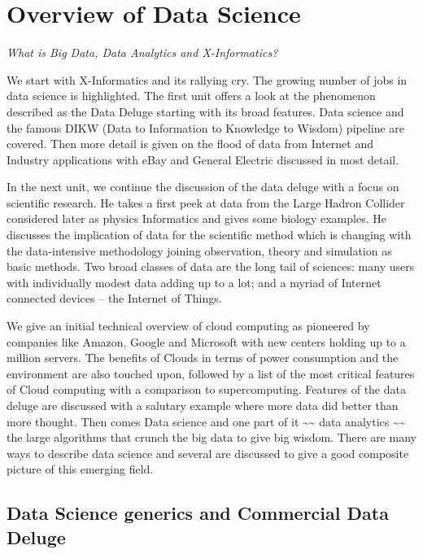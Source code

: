 

\section{Overview of Data Science}\label{overview-of-data-science}

\FILENAME

\emph{What is Big Data, Data Analytics and X-Informatics?}

We start with X-Informatics and its rallying cry.
The growing number of jobs in data science is highlighted. The first
unit offers a look at the phenomenon described as the Data Deluge
starting with its broad features. Data science and the famous DIKW (Data
to Information to Knowledge to Wisdom) pipeline are covered. Then more
detail is given on the flood of data from Internet and Industry
applications with eBay and General Electric discussed in most detail.

In the next unit, we continue the discussion of the data deluge with a
focus on scientific research. He takes a first peek at data from the
Large Hadron Collider considered later as physics Informatics and gives
some biology examples. He discusses the implication of data for the
scientific method which is changing with the data-intensive methodology
joining observation, theory and simulation as basic methods. Two broad
classes of data are the long tail of sciences: many users with
individually modest data adding up to a lot; and a myriad of Internet
connected devices -- the Internet of
Things.

We give an initial technical overview of cloud computing as pioneered by
companies like Amazon, Google and Microsoft with new centers holding up
to a million servers. The benefits of Clouds in terms of power
consumption and the environment are also touched upon, followed by a
list of the most critical features of Cloud computing with a comparison
to supercomputing. Features of the data deluge are discussed with a
salutary example where more data did better than more thought. Then
comes Data science and one part of it \textasciitilde{}\textasciitilde{}
data analytics \textasciitilde{}\textasciitilde{} the large algorithms
that crunch the big data to give big wisdom. There are many ways to
describe data science and several are discussed to give a good composite
picture of this emerging field.

\subsection{Data Science generics and Commercial Data
Deluge}\label{data-science-generics-and-commercial-data-deluge}


